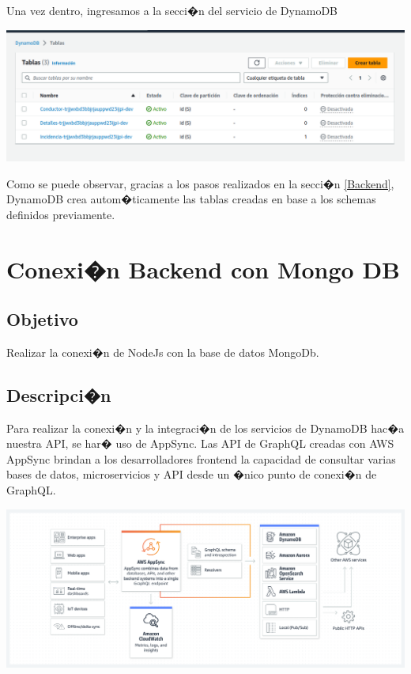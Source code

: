 \documentclass[12pt,letterpaper]{article}
\begin{document}
Una vez dentro, ingresamos a la secci�n del servicio de DynamoDB


\begin{center}
  \includegraphics[scale=0.5]{imagenes/tables}
 \label{fig:cognito} 
\end{center} 

Como se puede observar, gracias a los pasos realizados en la secci�n \ref{Backend}, DynamoDB crea autom�ticamente las tablas creadas en base a los schemas definidos previamente.

\newpage
\section{Conexi�n Backend con Mongo DB}



\subsection{Objetivo}
Realizar la conexi�n de NodeJs con la base de datos MongoDb.

\subsection{Descripci�n}
Para realizar la conexi�n y la integraci�n de los servicios de DynamoDB hac�a nuestra API, se har� uso de AppSync. Las API de GraphQL creadas con AWS AppSync brindan a los desarrolladores frontend la capacidad de consultar varias bases de datos, microservicios y API desde un �nico punto de conexi�n de GraphQL. 

\begin{center}
  \includegraphics[scale=0.4]{imagenes/appsync}
 \label{fig:MongoA} 
\end{center} 
\end{document}
